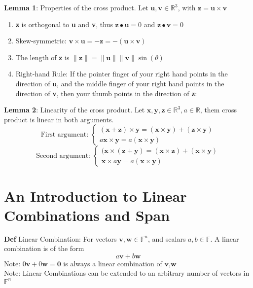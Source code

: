 \documentclass[11pt,notitlepage]{report}
\newcommand{\bb}[1]{\ensuremath{\mathbb{#1}}}
\newcommand{\tbf}[1]{\textbf{#1}}
\begin{document}
\textbf{Lemma 1}: Properties of the cross product. Let $\tbf u, \tbf v \in \mathbb R^3$, with $\tbf z = \tbf u \times \tbf v$
\begin{enumerate}[label=(\roman*)]
    \item \tbf z is orthogonal to \tbf u and \tbf v, thus $\tbf z \bullet \tbf u = 0$ and $\tbf z \bullet \tbf v = 0$
    \item Skew-symmetric: $\tbf v \times \tbf u = - \tbf z = - (\tbf u \times \tbf v)$
    \item The length of \tbf z is $\lVert \tbf z \rVert = \lVert \tbf u \rVert \lVert \tbf v \rVert \sin(\theta)$
    \item Right-hand Rule: If the pointer finger of your right hand points in the direction of \tbf u, and the middle finger of your right hand points in the direction of \tbf v, then your thumb points in the direction of \tbf z:
\end{enumerate}

\textbf{Lemma 2}: Linearity of the cross product. Let $\tbf x, \tbf y, \tbf z \in \bb R^3, a \in \bb R$, them cross product is linear in both arguments.
$$\text{First argument:   }\begin{cases}
    (\tbf x + \tbf z) \times \tbf y = (\tbf x \times \tbf y) + (\tbf z \times \tbf y)\\
    a\tbf x \times \tbf y = a(\tbf x \times \tbf y)
\end{cases}$$
$$\text{Second argument:   }\begin{cases}
    (\tbf x \times (\tbf z + \tbf y) = (\tbf x \times \tbf z) + (\tbf x \times \tbf y)\\
    \tbf x \times a\tbf y = a(\tbf x \times \tbf y)
\end{cases}$$

\section{An Introduction to Linear Combinations and Span}

\textbf{Def} Linear Combination: For vectors $\tbf v, \tbf w \in \mathbb F^n$, and scalars $a, b \in \bb F$. A linear combination is of the form
$$a\tbf v + b \tbf w$$
\hspace*{5mm} Note: $0 \tbf v + 0 \tbf w = \tbf 0$ is always a linear combination of $\tbf v, \tbf w$\\
\hspace*{5mm} Note: Linear Combinations can be extended to an arbitrary number of vectors in $\bb F^n$
\end{document}
